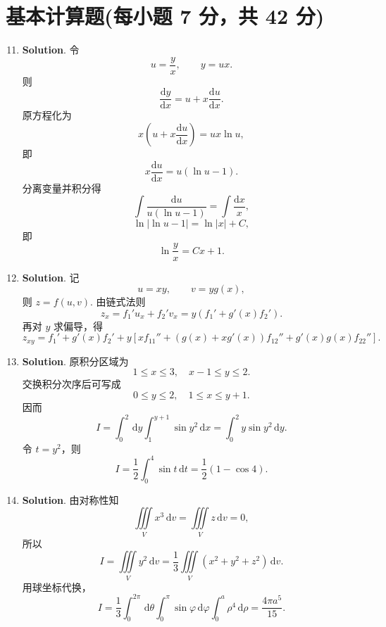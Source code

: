 \documentclass[../main.tex]{subfiles}
\begin{document}
\section{基本计算题(每小题 7 分，共 42 分)}
\begin{enumerate}
    \setcounter{enumi}{10}
    \item \textbf{Solution}. 令
          \[
              u=\frac{y}{x},\qquad y=ux.
          \]
          则
          \[
              \frac{\mathrm{d}y}{\mathrm{d}x}=u+x\frac{\mathrm{d}u}{\mathrm{d}x}.
          \]
          原方程化为
          \[
              x\left(u+x\frac{\mathrm{d}u}{\mathrm{d}x}\right)=ux\ln u,
          \]
          即
          \[
              x\frac{\mathrm{d}u}{\mathrm{d}x}=u(\ln u-1).
          \]
          分离变量并积分得
          \[
              \int \frac{\mathrm{d}u}{u(\ln u-1)}=\int \frac{\mathrm{d}x}{x},
          \]
          \[
              \ln\left|\ln u -1\right|=\ln|x| + C,
          \]
          即
          \[
              \ln \frac{y}{x} = Cx + 1.
          \]

    \item \textbf{Solution}. 记
          \[
              u=xy,\qquad v=yg(x),
          \]
          则 \(z=f(u,v)\). 由链式法则
          \[
              z_x=f_1'u_x+f_2'v_x=y(f_1'+g'(x)f_2').
          \]
          再对 \(y\) 求偏导，得
          \[
              z_{xy}=f_1'+g'(x)f_2'+y\left[xf_{11}''+(g(x)+xg'(x))f_{12}''+g'(x)g(x)f_{22}''\right].
          \]

    \item \textbf{Solution}. 原积分区域为
          \[
              1\le x\le 3,\quad x-1\le y\le 2.
          \]
          交换积分次序后可写成
          \[
              0\le y\le 2,\quad 1\le x\le y+1.
          \]
          因而
          \[
              I=\int_0^2\,\mathrm{d}y\int_1^{y+1}\sin y^2\,\mathrm{d}x
              =\int_0^2 y\sin y^2\,\mathrm{d}y.
          \]
          令 \(t=y^2\)，则
          \[
              I=\frac12\int_0^4\sin t\,\mathrm{d}t
              =\frac12(1-\cos4).
          \]

    \item \textbf{Solution}. 由对称性知
          \[
              \iiint\limits_V x^3\,\mathrm{d}v=\iiint\limits_V z\,\mathrm{d}v=0,
          \]
          所以
          \[
              I=\iiint\limits_V y^2\,\mathrm{d}v=\frac{1}{3}\iiint\limits_V (x^2+y^2+z^2)\,\mathrm{d}v.
          \]
          用球坐标代换，
          \[
              I=\frac{1}{3}\int_0^{2\pi}\,\mathrm{d}\theta\int_0^\pi\sin\varphi\,\mathrm{d}\varphi\int_0^a \rho^4\,\mathrm{d}\rho
              =\frac{4\pi a^5}{15}.
          \]


\end{enumerate}
\end{document}
